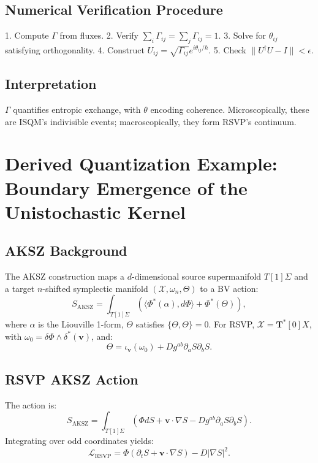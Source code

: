 \documentclass[12pt]{article}
\begin{document}
\subsection{Numerical Verification Procedure}

1. Compute \(\Gamma\) from fluxes.
2. Verify \(\sum_i \Gamma_{ij} = \sum_j \Gamma_{ij} = 1\).
3. Solve for \(\theta_{ij}\) satisfying orthogonality.
4. Construct \(U_{ij} = \sqrt{\Gamma_{ij}} e^{i \theta_{ij} / \hbar}\).
5. Check \(\|U^\dagger U - I\| < \epsilon\).

\subsection{Interpretation}

\(\Gamma\) quantifies entropic exchange, with \(\theta\) encoding coherence. Microscopically, these are ISQM’s indivisible events; macroscopically, they form RSVP’s continuum.

\section{Derived Quantization Example: Boundary Emergence of the Unistochastic Kernel}

\subsection{AKSZ Background}

The AKSZ construction maps a \(d\)-dimensional source supermanifold \(T[1]\Sigma\) and a target \(n\)-shifted symplectic manifold \((\mathcal{X}, \omega_n, \Theta)\) to a BV action:
\[
S_{\mathrm{AKSZ}} = \int_{T[1]\Sigma} \left( \langle \Phi^*(\alpha), d\Phi \rangle + \Phi^*(\Theta) \right),
\]
where \(\alpha\) is the Liouville 1-form, \(\Theta\) satisfies \(\{\Theta, \Theta\} = 0\). For RSVP, \(\mathcal{X} = \mathbf{T}^*[0]X\), with \(\omega_0 = \delta \Phi \wedge \delta^* (\mathbf{v})\), and:
\[
\Theta = \iota_{\mathbf{v}}(\omega_0) + D g^{ab} \partial_a S \partial_b S.
\]

\subsection{RSVP AKSZ Action}

The action is:
\[
S_{\mathrm{AKSZ}} = \int_{T[1]\Sigma} \left( \Phi dS + \mathbf{v} \cdot \nabla S - D g^{ab} \partial_a S \partial_b S \right).
\]
Integrating over odd coordinates yields:
\[
\mathcal{L}_{\mathrm{RSVP}} = \Phi (\partial_t S + \mathbf{v} \cdot \nabla S) - D |\nabla S|^2.
\]
\end{document}
